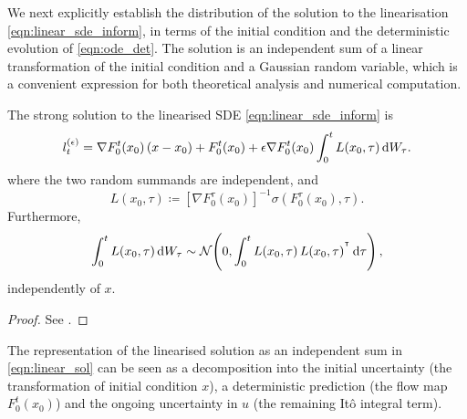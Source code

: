 We next explicitly establish the distribution of the solution to the linearisation \eqref{eqn:linear_sde_inform}, in terms of the initial condition and the deterministic evolution of \eqref{eqn:ode_det}.
The solution is an independent sum of a linear transformation of the initial condition and a Gaussian random variable, which is a convenient expression for both theoretical analysis and numerical computation.

\begin{theorem}\label{thm:limit_sol}
	The strong solution to the linearised SDE \eqref{eqn:linear_sde_inform} is
	\begin{equation}
		l_t^{(\epsilon)} = \nabla F_0^t\!\left(x_0\right)\left(x - x_0\right) + F_0^t\!\left(x_0\right) + \epsilon\nabla F_0^t\!\left(x_0\right)\int_0^t{L\!\left(x_0, \tau\right)\dif W_\tau}.
		\label{eqn:linear_sol}
	\end{equation}
	where the two random summands are independent, and
	\begin{equation}
		L\!\left(x_0, \tau\right) \coloneqq \left[\nabla F_0^\tau(x_0)\right]^{-1}\sigma\left(F_0^\tau(x_0), \tau\right).
		\label{eqn:sigma_L_def}
	\end{equation}
	Furthermore,
	\[
		\int_0^t{L\!\left(x_0,\tau\right)\dif W_\tau} \isGauss{0, \int_0^t{L\!\left(x_0, \tau\right)L\!\left(x_0, \tau\right)^{\T}\dif\tau}},
	\]
	independently of \(x\).
\end{theorem}
\begin{proof}
	See .
\end{proof}

The representation of the linearised solution as an independent sum in \eqref{eqn:linear_sol} can be seen as a decomposition into the initial uncertainty (the transformation of initial condition \(x\)), a deterministic prediction (the flow map \(F_0^t\!\left(x_0\right)\)) and the ongoing uncertainty in \(u\) (the remaining It\^o integral term).

